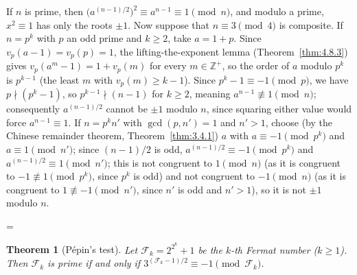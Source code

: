 \documentclass[11pt]{article}
\makeatletter
\theoremstyle{ntstyle}
\newtheorem{theorem}{Theorem}[subsection]
\let\nt@closedisplay\]
\def\nt@guardedclose{\@ifnextchar\par{\nt@closeafterpar}{\@ifnextchar\end{\postdisplaypenalty\@M\nt@closedisplay}{\nt@closedisplay}}}
\def\nt@closeafterpar\par{\@ifnextchar\par{\nt@closeafterpar}{\@ifnextchar\end{\postdisplaypenalty\@M\nt@closedisplay\par}{\nt@closedisplay\par}}}
\renewenvironment{proof}[1][\proofname]{\par
  \pushQED{\qed}\normalfont\topsep\medskipamount\edef\nt@afterproof{\@endparpenalty=\the\@endparpenalty\relax}\@beginparpenalty\@M\@endparpenalty\@M\let\]\nt@guardedclose\trivlist\item[]\textit{#1\@addpunct{.}} \ignorespaces}{\ifvmode\addpenalty\@M\fi\popQED\nt@afterproof\endtrivlist\@endpefalse}
\makeatother
\begin{document}
\begin{proof} If $n$ is prime, then
	$\big(a^{(n-1)/2}\big)^{2}\equiv a^{n-1}\equiv1\pmod{n}$, and modulo a
	prime, $x^{2}\equiv1$ has only the roots $\pm1$. Now suppose that $n\equiv3\pmod{4}$ is
	composite. If $n=p^{k}$ with $p$ an odd prime and $k\ge2$, take $a=1+p$. Since
	$v_p(a-1)=v_p(p)=1$, the lifting-the-exponent lemma (Theorem~\ref{thm:4.8.3}) gives
	$v_p(a^{m}-1)=1+v_p(m)$ for every $m\in\mathbb{Z}^+$, so the order
	of $a$ modulo $p^{k}$ is $p^{k-1}$ (the least $m$ with $v_p(m)\ge
		k-1$). Since $p^{k}-1\equiv-1\pmod{p}$, we have $p\nmid(p^{k}-1)$, so
	$p^{k-1}\nmid(n-1)$ for $k\ge2$, meaning
	$a^{n-1}\not\equiv1\pmod{n}$; consequently $a^{(n-1)/2}$ cannot
	be $\pm1$ modulo $n$, since squaring either value would force
	$a^{n-1}\equiv1$. If $n=p^{k}n'$ with $\gcd(p, n')=1$ and $n'>1$, choose
	(by the Chinese remainder theorem, Theorem~\ref{thm:3.4.1})
	$a$ with $a\equiv-1\pmod{p^{k}}$ and $a\equiv1\pmod{n'}$; since
	$(n-1)/2$ is odd, $a^{(n-1)/2}\equiv-1\pmod{p^{k}}$ and
	$a^{(n-1)/2}\equiv1\pmod{n'}$; this is not congruent to $1\pmod{n}$ (as it is
	congruent to $-1\not\equiv1\pmod{p^{k}}$, since $p^k$ is odd) and not
	congruent to $-1\pmod{n}$ (as it is congruent to $1\not\equiv-1\pmod{n'}$, since
	$n'$ is odd and $n'>1$), so it is not $\pm1$ modulo $n$.

\end{proof}
\begin{theorem}[P{\'e}pin's test]\label{thm:9.1.2} Let
	$\mathcal{F}_k=2^{2^{k}}+1$ be the $k$-th Fermat number ($k\ge1$). Then $\mathcal{F}_k$
	is prime if and only if $3^{(\mathcal{F}_k-1)/2}\equiv-1\pmod{\mathcal{F}_k}$.

\end{theorem}
\end{document}
